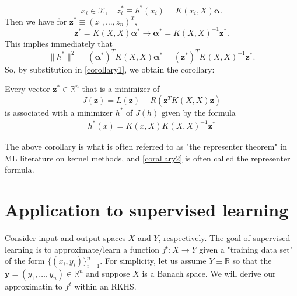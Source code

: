 \documentclass[11pt]{book} %
\begin{document}
\[
x_i \in \mathcal{X}, \quad z_i^* \equiv h^*(x_i) = K(x_i,X)\mathbf{\alpha}.
\]
Then we have for $\mathbf{z}^* \equiv (z_1,\hdots,z_n)^T$,
\[
\mathbf{z}^* = K(X,X) \mathbf{\alpha}^* \to \mathbf{\alpha}^*  = K(X,X)^{-1} \mathbf{z}^*.
\]
This implies immediately that
\[
\|h^*\|^2 = (\mathbf{\alpha}^*)^T K(X,X) \mathbf{\alpha}^* = (\mathbf{z}^*)^T K(X,X)^{-1} \mathbf{z}^*.
\]
So, by substitution in \ref{corollary1}, we obtain the corollary:

\begin{corollary}
    Every vector $\mathbf z^* \in \mathbb R^n$ that is a minimizer of $$J(\mathbf z) = L(\mathbf z) + R(\mathbf z^T K(X,X) \mathbf z)$$
    is associated with a minimizer $h^*$ of $J(h)$ given by the formula \begin{align}\label{corallary2} h^*(x) = K(x, X) K(X, X)^{-1} \mathbf z^*\end{align}
\end{corollary}

The above corollary is what is often referred to as "the representer theorem" in ML literature on kernel methods, and \ref{corallary2} is often called the representer formula. 

\section{Application to supervised learning}

Consider input and output spaces $X$ and $Y$, respectively. The goal of supervised learning is to approximate/learn a function $f^t: X \rightarrow Y$ given a "training data set" of the form $\{(x_i, y_i)\}_{i=1}^n$. For simplicity, let us assume $Y \equiv \mathbb R$ so that the $\mathbf y = (y_1, \dots, y_n) \in \mathbb R^n$ and suppose $X$ is a Banach space. We will derive our approximatin to $f^t$ within an RKHS. 
\end{document}
